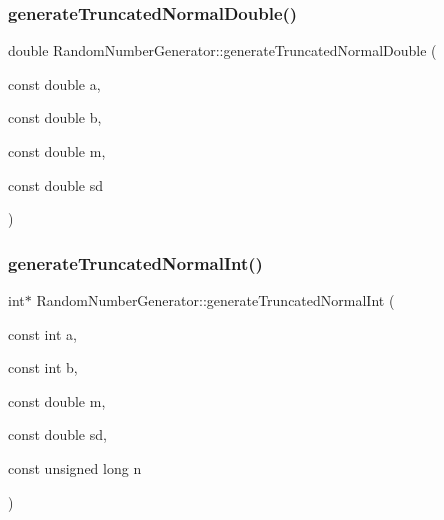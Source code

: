 \subsubsection{\texorpdfstring{generate\+Truncated\+Normal\+Double()}{generateTruncatedNormalDouble()}\hspace{0.1cm}{\footnotesize\ttfamily [2/2]}}
{\footnotesize\ttfamily double Random\+Number\+Generator\+::generate\+Truncated\+Normal\+Double (\begin{DoxyParamCaption}\item[{const double}]{a,  }\item[{const double}]{b,  }\item[{const double}]{m,  }\item[{const double}]{sd }\end{DoxyParamCaption})}

\mbox{\label{class_random_number_generator_a9204cf57bae1189b576307699b07747b}} 
\subsubsection{\texorpdfstring{generate\+Truncated\+Normal\+Int()}{generateTruncatedNormalInt()}\hspace{0.1cm}{\footnotesize\ttfamily [1/2]}}
{\footnotesize\ttfamily int$\ast$ Random\+Number\+Generator\+::generate\+Truncated\+Normal\+Int (\begin{DoxyParamCaption}\item[{const int}]{a,  }\item[{const int}]{b,  }\item[{const double}]{m,  }\item[{const double}]{sd,  }\item[{const unsigned long}]{n }\end{DoxyParamCaption})}

